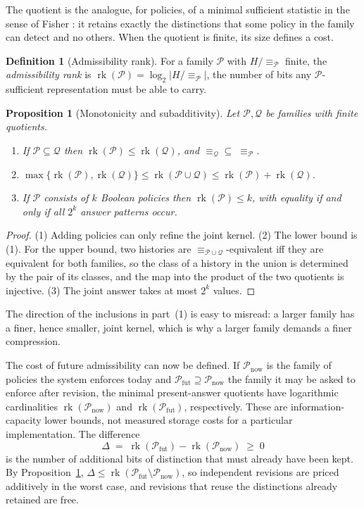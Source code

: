 \documentclass[11pt]{article}
\newtheorem{proposition}{Proposition}
\theoremstyle{definition}
\newtheorem{definition}{Definition}
\theoremstyle{remark}
\newcommand{\Hist}{H}
\newcommand{\Pol}{\mathcal{P}}
\newcommand{\Fut}{\mathcal{P}_{\mathrm{fut}}}
\newcommand{\Now}{\mathcal{P}_{\mathrm{now}}}
\newcommand{\eqv}[1]{\equiv_{#1}}
\newcommand{\rank}{\operatorname{rk}}
\begin{document}
The quotient is the analogue, for policies, of a minimal sufficient statistic in the sense of Fisher \cite{fisher}: it retains exactly the distinctions that some policy in the family can detect and no others. When the quotient is finite, its size defines a cost.

\begin{definition}[Admissibility rank]
For a family $\Pol$ with $\Hist/{\eqv{\Pol}}$ finite, the \emph{admissibility rank} is $\rank(\Pol)=\log_2\bigl|\Hist/{\eqv{\Pol}}\bigr|$, the number of bits any $\Pol$-sufficient representation must be able to carry.
\end{definition}

\begin{proposition}[Monotonicity and subadditivity]\label{prop:rank}
Let $\Pol,\mathcal{Q}$ be families with finite quotients.
\begin{enumerate}
\item If $\Pol\subseteq\mathcal{Q}$ then $\rank(\Pol)\le\rank(\mathcal{Q})$, and $\eqv{\mathcal{Q}}\subseteq\;\eqv{\Pol}$.
\item $\max\{\rank(\Pol),\rank(\mathcal{Q})\}\le \rank(\Pol\cup\mathcal{Q})\le\rank(\Pol)+\rank(\mathcal{Q})$.
\item If $\Pol$ consists of $k$ Boolean policies then $\rank(\Pol)\le k$, with equality if and only if all $2^k$ answer patterns occur.
\end{enumerate}
\end{proposition}

\begin{proof}
(1) Adding policies can only refine the joint kernel. (2) The lower bound is (1). For the upper bound, two histories are $\eqv{\Pol\cup\mathcal{Q}}$-equivalent iff they are equivalent for both families, so the class of a history in the union is determined by the pair of its classes, and the map into the product of the two quotients is injective. (3) The joint answer takes at most $2^k$ values.
\end{proof}

The direction of the inclusions in part~(1) is easy to misread: a larger family has a finer, hence smaller, joint kernel, which is why a larger family demands a finer compression.

The cost of future admissibility can now be defined. If $\Now$ is the family of policies the system enforces today and $\Fut\supseteq\Now$ the family it may be asked to enforce after revision, the minimal present-answer quotients have logarithmic cardinalities $\rank(\Now)$ and $\rank(\Fut)$, respectively. These are information-capacity lower bounds, not measured storage costs for a particular implementation. The difference
\[
\Delta\;=\;\rank(\Fut)-\rank(\Now)\;\ge\;0
\]
is the number of additional bits of distinction that must already have been kept. By Proposition~\ref{prop:rank}, $\Delta\le\rank(\Fut\setminus\Now)$, so independent revisions are priced additively in the worst case, and revisions that reuse the distinctions already retained are free.
\end{document}
